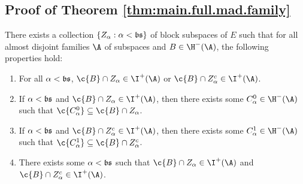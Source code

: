 \documentclass[11pt,reqno]{amsart}
\begin{document}
\subsection{Proof of Theorem \ref{thm:main.full.mad.family}}
\begin{lemma}
\label{lem:splitting.lemma}
    There exists a collection $\{Z_\alpha : \alpha < \frak{bs}\}$ of block subspaces of $E$ such that for all almost disjoint families $\A$ of subspaces and $B \in \H^-(\A)$, the following properties hold:
    \begin{enumerate}[label=(\roman*)]
        \item For all $\alpha < \frak{bs}$, $\c{B} \cap Z_\alpha \in \I^+(\A)$ or $\c{B} \cap Z_\alpha^c \in \I^+(\A)$.
    
        \item If $\alpha < \frak{bs}$ and $\c{B} \cap Z_\alpha \in \I^+(\A)$, then there exists some $C_\alpha^0 \in \H^-(\A)$ such that $\c{C_\alpha^0} \subseteq \c{B} \cap Z_\alpha$.

        \item If $\alpha < \frak{bs}$ and $\c{B} \cap Z_\alpha^c \in \I^+(\A)$, then there exists some $C_\alpha^1 \in \H^-(\A)$ such that $\c{C_\alpha^1} \subseteq \c{B} \cap Z_\alpha^c$.

        \item There exists some $\alpha < \frak{bs}$ such that $\c{B} \cap Z_\alpha \in \I^+(\A)$ and $\c{B} \cap Z_\alpha^c \in \I^+(\A)$.
    \end{enumerate}
\end{lemma}
\end{document}
